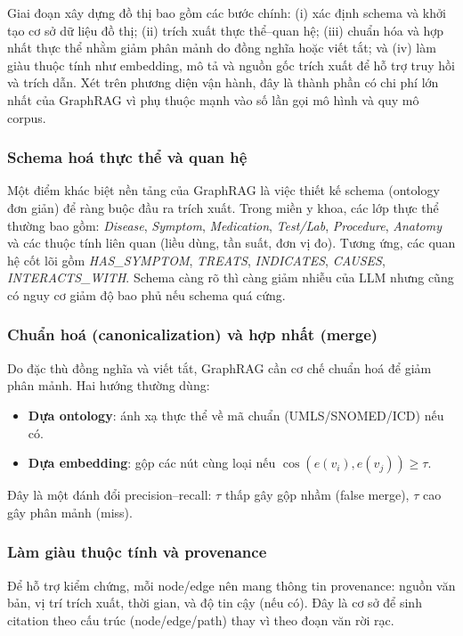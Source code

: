 \documentclass[a4paper,12pt,twoside]{report}
\begin{document}
Giai đoạn xây dựng đồ thị bao gồm các bước chính: (i) xác định schema và khởi tạo cơ sở dữ liệu đồ thị; (ii) trích xuất thực thể--quan hệ; (iii) chuẩn hóa và hợp nhất thực thể nhằm giảm phân mảnh do đồng nghĩa hoặc viết tắt; và (iv) làm giàu thuộc tính như embedding, mô tả và nguồn gốc trích xuất để hỗ trợ truy hồi và trích dẫn. Xét trên phương diện vận hành, đây là thành phần có chi phí lớn nhất của GraphRAG vì phụ thuộc mạnh vào số lần gọi mô hình và quy mô corpus.

\subsubsection{Schema hoá thực thể và quan hệ}
Một điểm khác biệt nền tảng của GraphRAG là việc thiết kế schema (ontology đơn giản) để ràng buộc đầu ra trích xuất. Trong miền y khoa, các lớp thực thể thường bao gồm: \textit{Disease}, \textit{Symptom}, \textit{Medication}, \textit{Test/Lab}, \textit{Procedure}, \textit{Anatomy} và các thuộc tính liên quan (liều dùng, tần suất, đơn vị đo). Tương ứng, các quan hệ cốt lõi gồm \textit{HAS\_SYMPTOM}, \textit{TREATS}, \textit{INDICATES}, \textit{CAUSES}, \textit{INTERACTS\_WITH}. Schema càng rõ thì càng giảm nhiễu của LLM nhưng cũng có nguy cơ giảm độ bao phủ nếu schema quá cứng.

\subsubsection{Chuẩn hoá (canonicalization) và hợp nhất (merge)}
Do đặc thù đồng nghĩa và viết tắt, GraphRAG cần cơ chế chuẩn hoá để giảm phân mảnh. Hai hướng thường dùng:
\begin{itemize}[nosep]
  \item \textbf{Dựa ontology}: ánh xạ thực thể về mã chuẩn (UMLS/SNOMED/ICD) nếu có.
  \item \textbf{Dựa embedding}: gộp các nút cùng loại nếu \(\cos(e(v_i),e(v_j))\ge \tau\).
\end{itemize}
Đây là một đánh đổi precision--recall: \(\tau\) thấp gây gộp nhầm (false merge), \(\tau\) cao gây phân mảnh (miss).

\subsubsection{Làm giàu thuộc tính và provenance}
Để hỗ trợ kiểm chứng, mỗi node/edge nên mang thông tin provenance: nguồn văn bản, vị trí trích xuất, thời gian, và độ tin cậy (nếu có). Đây là cơ sở để sinh citation theo cấu trúc (node/edge/path) thay vì theo đoạn văn rời rạc.
\end{document}
